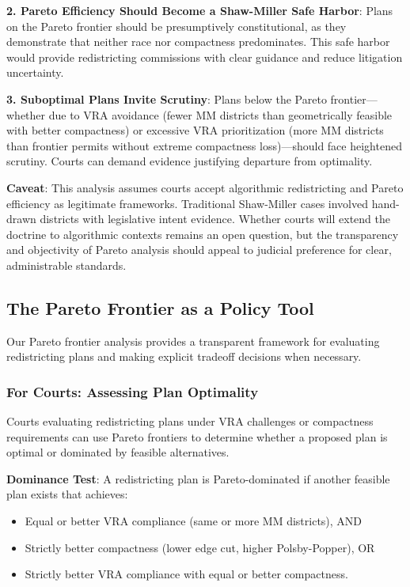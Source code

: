 \textbf{2. Pareto Efficiency Should Become a Shaw-Miller Safe Harbor}: Plans on the Pareto frontier should be presumptively constitutional, as they demonstrate that neither race nor compactness predominates. This safe harbor would provide redistricting commissions with clear guidance and reduce litigation uncertainty.

\textbf{3. Suboptimal Plans Invite Scrutiny}: Plans below the Pareto frontier---whether due to VRA avoidance (fewer MM districts than geometrically feasible with better compactness) or excessive VRA prioritization (more MM districts than frontier permits without extreme compactness loss)---should face heightened scrutiny. Courts can demand evidence justifying departure from optimality.

\textbf{Caveat}: This analysis assumes courts accept algorithmic redistricting and Pareto efficiency as legitimate frameworks. Traditional Shaw-Miller cases involved hand-drawn districts with legislative intent evidence. Whether courts will extend the doctrine to algorithmic contexts remains an open question, but the transparency and objectivity of Pareto analysis should appeal to judicial preference for clear, administrable standards.

\subsection{The Pareto Frontier as a Policy Tool}

Our Pareto frontier analysis provides a transparent framework for evaluating redistricting plans and making explicit tradeoff decisions when necessary.

\subsubsection{For Courts: Assessing Plan Optimality}

Courts evaluating redistricting plans under VRA challenges or compactness requirements can use Pareto frontiers to determine whether a proposed plan is optimal or dominated by feasible alternatives.

\textbf{Dominance Test}: A redistricting plan is Pareto-dominated if another feasible plan exists that achieves:
\begin{itemize}
    \item Equal or better VRA compliance (same or more MM districts), AND
    \item Strictly better compactness (lower edge cut, higher Polsby-Popper), OR
    \item Strictly better VRA compliance with equal or better compactness.
\end{itemize}

